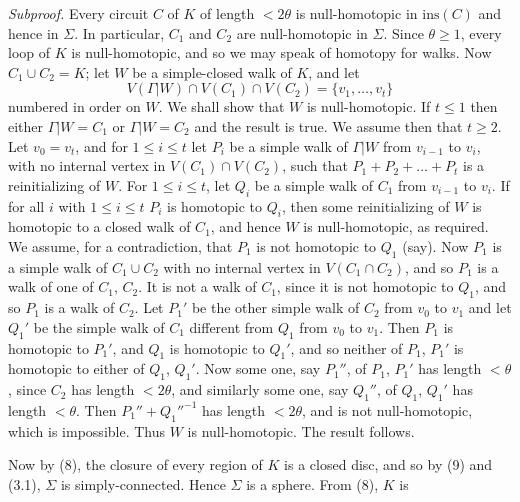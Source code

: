 \textit{Subproof.} Every circuit $C$ of $K$ of length $< 2\theta$ is null-homotopic in $\text{ins}(C)$ and hence in $\Sigma$. In particular, $C_1$ and $C_2$ are null-homotopic in $\Sigma$. Since $\theta \ge 1$, every loop of $K$ is null-homotopic, and so we may speak of homotopy for walks. Now $C_1 \cup C_2 = K$; let $W$ be a simple-closed walk of $K$, and let
\begin{equation*}
V(\Gamma | W) \cap V(C_1) \cap V(C_2) = \{v_1, \dots, v_t\}
\end{equation*}
numbered in order on $W$. We shall show that $W$ is null-homotopic. If $t \le 1$ then either $\Gamma | W = C_1$ or $\Gamma | W = C_2$ and the result is true. We assume then that $t \ge 2$. Let $v_0 = v_t$, and for $1 \le i \le t$ let $P_i$ be a simple walk of $\Gamma | W$ from $v_{i-1}$ to $v_i$, with no internal vertex in $V(C_1) \cap V(C_2)$, such that $P_1 + P_2 + \dots + P_t$ is a reinitializing of $W$. For $1 \le i \le t$, let $Q_i$ be a simple walk of $C_1$ from $v_{i-1}$ to $v_i$. If for all $i$ with $1 \le i \le t$ $P_i$ is homotopic to $Q_i$, then some reinitializing of $W$ is homotopic to a closed walk of $C_1$, and hence $W$ is null-homotopic, as required. We assume, for a contradiction, that $P_1$ is not homotopic to $Q_1$ (say). Now $P_1$ is a simple walk of $C_1 \cup C_2$ with no internal vertex in $V(C_1 \cap C_2)$, and so $P_1$ is a walk of one of $C_1$, $C_2$. It is not a walk of $C_1$, since it is not homotopic to $Q_1$, and so $P_1$ is a walk of $C_2$. Let $P_1'$ be the other simple walk of $C_2$ from $v_0$ to $v_1$ and let $Q_1'$ be the simple walk of $C_1$ different from $Q_1$ from $v_0$ to $v_1$. Then $P_1$ is homotopic to $P_1'$, and $Q_1$ is homotopic to $Q_1'$, and so neither of $P_1$, $P_1'$ is homotopic to either of $Q_1$, $Q_1'$. Now some one, say $P_1''$, of $P_1$, $P_1'$ has length $< \theta$, since $C_2$ has length $< 2\theta$, and similarly some one, say $Q_1''$, of $Q_1$, $Q_1'$ has length $< \theta$. Then $P_1'' + Q_1''^{-1}$ has length $< 2\theta$, and is not null-homotopic, which is impossible. Thus $W$ is null-homotopic. The result follows.

Now by (8), the closure of every region of $K$ is a closed disc, and so by (9) and (3.1), $\Sigma$ is simply-connected. Hence $\Sigma$ is a sphere. From (8), $K$ is
